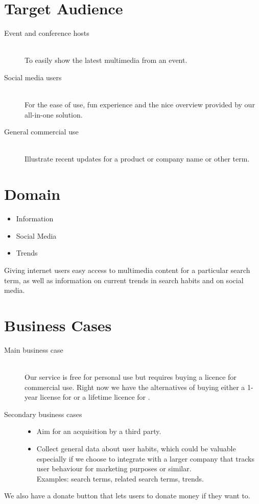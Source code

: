 \section{Target Audience}
\begin{description}
  \item[Event and conference hosts] \hfill \\
  To easily show the latest multimedia from an event.
  \item[Social media users] \hfill \\
  For the ease of use, fun experience and the nice overview provided by our
  all-in-one solution.
  \item[General commercial use] \hfill \\
  Illustrate recent updates for a product or company name or other term.
\end{description}

\section{Domain}
\begin{itemize}
  \item Information
  \item Social Media
  \item Trends
\end{itemize}
Giving internet users easy access to multimedia content for a particular search
term, as well as information on current trends in search habits and on social
media.

\section{Business Cases}
\begin{description}
  \item[Main business case] \hfill \\
  Our service is free for personal use but requires buying a licence for
  commercial use. Right now we have the alternatives of buying either a 1-year
  license for  or a lifetime licence for .
  \item[Secondary business cases] \hfill
  \begin{itemize}
    \item Aim for an acquisition by a third party.
    \item Collect general data about user habits, which could be valuable
          especially if we choose to integrate with a larger company that tracks
          user behaviour for marketing purposes or similar. \\
          Examples: search terms, related search terms, trends.
   \end{itemize}
\end{description}
We also have a donate button that lets users to donate money if they want to.

